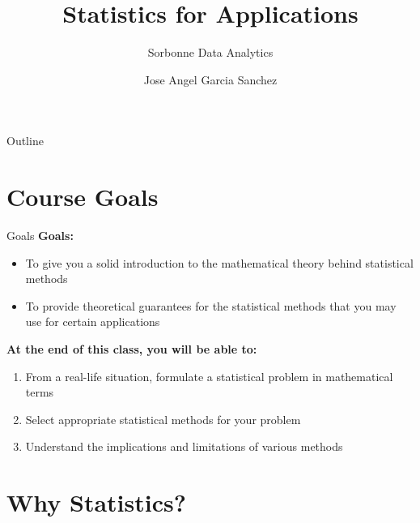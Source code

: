 \documentclass[aspectratio=169]{beamer}
\title{Statistics for Applications}
\subtitle{Sorbonne Data Analytics}
\author{Jose Angel Garcia Sanchez}
\institute{Université Paris 1 Panthéon-Sorbonne}
\date{} %
\begin{document}
{
\begin{frame}
\titlepage
\end{frame}
}

\begin{frame}{Outline}
\tableofcontents
\end{frame}

\section{Course Goals}

\begin{frame}{Goals}
\textbf{Goals:}
\begin{itemize}
    \item To give you a solid introduction to the mathematical theory behind statistical methods
    \item To provide theoretical guarantees for the statistical methods that you may use for certain applications
\end{itemize}

\vspace{0.5cm}

\textbf{At the end of this class, you will be able to:}
\begin{enumerate}
    \item From a real-life situation, formulate a statistical problem in mathematical terms
    \item Select appropriate statistical methods for your problem
    \item Understand the implications and limitations of various methods
\end{enumerate}
\end{frame}

\section{Why Statistics?}
\end{document}
